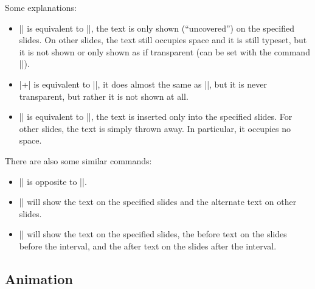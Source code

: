 \begin{fragileframe}

Some explanations:

\begin{itemize}
\item \LC|\onslide| is equivalent to \LC|\uncover|, the text is only shown (``uncovered'') on the specified slides. On other slides, \alert{the text still occupies space} and it is still typeset, but it is not shown or only shown as if transparent (can be set with the command \LC|\setbeamercovered|).
\item \LC|\onslide+| is equivalent to \LC|\visible|, it does almost the same as \LC|\uncover|, but it is never transparent, but rather it is not shown at all.
\item \LC|\onslide*| is equivalent to \LC|\only|, the text is inserted only into
the specified slides. For other slides, the text is simply thrown away. In particular, \alert{it occupies no space}.
\end{itemize}

There are also some similar commands:

\begin{itemize}
\item \LC|| is opposite to \LC|\visible|.
\item \LC|| will show the text on the specified slides and the alternate text on other slides.
\item \LC|| will show the text on the specified slides, the before text on the slides before the interval, and the after text on the slides after the interval.
\end{itemize}

\end{fragileframe}

\subsection{Animation}


